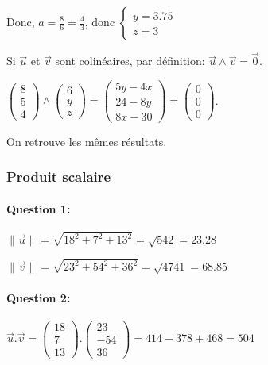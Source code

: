 Donc, $a=\frac{8}{6}=\frac{4}{3}$, donc $\left\{\begin{array}{c}y=3.75 \\ z=3 \end{array}\right.$

Si $\overrightarrow{u}$ et $\overrightarrow{v}$ sont colinéaires, par définition: $\overrightarrow{u} \wedge \overrightarrow{v}=\overrightarrow{0}$.

$\left(\begin{array}{c}8 \\ 5 \\ 4 \end{array}\right) \wedge \left(\begin{array}{c}6 \\ y \\ z \end{array}\right)=\left(\begin{array}{c} 5y-4x \\ 24 - 8y \\ 8x-30 \end{array}\right)=\left(\begin{array}{c} 0 \\ 0 \\ 0 \end{array}\right)$.

On retrouve les mêmes résultats.

\subsubsection{Produit scalaire}

\paragraph{Question 1:} $\|\overrightarrow{u}\|=\sqrt{18^2+7^2+13^2}=\sqrt{542}=23.28$

$\|\overrightarrow{v}\|=\sqrt{23^2+54^2+36^2}=\sqrt{4741}=68.85$

\paragraph{Question 2:} $\overrightarrow{u}.\overrightarrow{v}=\left(\begin{array}{c} 18 \\ 7 \\ 13 \end{array}\right).\left(\begin{array}{c} 23 \\ -54 \\ 36 \end{array}\right)=414-378+468=504$

